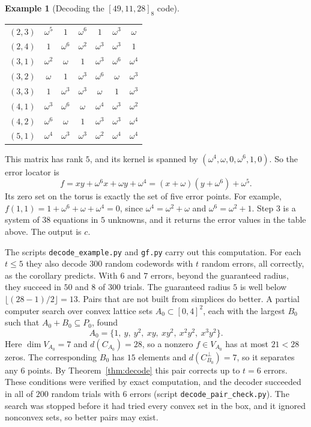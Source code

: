 \documentclass[12pt,letterpaper]{article}
\numberwithin{equation}{section}
\theoremstyle{definition}
\newtheorem{example}[theorem]{Example}
\theoremstyle{remark}
\begin{document}
\begin{example}[{Decoding the $[49,11,28]_8$ code}]
\begin{center}
\begin{tabular}{@{}c|cccccc@{}}
$(2,3)$ & $\omega^{5}$ & $1$ & $\omega^{6}$ & $1$ & $\omega^{3}$ & $\omega$\\
$(2,4)$ & $1$ & $\omega^{6}$ & $\omega^{2}$ & $\omega^{3}$ & $\omega^{3}$ & $1$\\
$(3,1)$ & $\omega^{2}$ & $\omega$ & $1$ & $\omega^{3}$ & $\omega^{6}$ & $\omega^{4}$\\
$(3,2)$ & $\omega$ & $1$ & $\omega^{3}$ & $\omega^{6}$ & $\omega$ & $\omega^{3}$\\
$(3,3)$ & $1$ & $\omega^{3}$ & $\omega^{3}$ & $\omega$ & $1$ & $\omega^{3}$\\
$(4,1)$ & $\omega^{3}$ & $\omega^{6}$ & $\omega$ & $\omega^{4}$ & $\omega^{3}$ & $\omega^{2}$\\
$(4,2)$ & $\omega^{6}$ & $\omega$ & $1$ & $\omega^{3}$ & $\omega^{3}$ & $\omega^{4}$\\
$(5,1)$ & $\omega^{4}$ & $\omega^{3}$ & $\omega^{3}$ & $\omega^{2}$ & $\omega^{4}$ & $\omega^{4}$\\
\end{tabular}
\end{center}
This matrix has rank $5$, and its kernel is spanned by
$(\omega^4,\omega,0,\omega^6,1,0)$. So the error locator is
\[
f=xy+\omega^6x+\omega y+\omega^4=(x+\omega)(y+\omega^6)+\omega^5 .
\]
Its zero set on the torus is exactly the set of five error points. For example,
$f(1,1)=1+\omega^6+\omega+\omega^4=0$, since $\omega^4=\omega^2+\omega$ and
$\omega^6=\omega^2+1$. Step 3 is a system of $38$ equations in $5$ unknowns,
and it returns the error values in the table above. The output is $c$.

The scripts \texttt{decode\_example.py} and \texttt{gf.py} carry out this
computation. For each $t\le5$ they also decode $300$ random codewords with $t$
random errors, all correctly, as the corollary predicts. With $6$ and $7$
errors, beyond the guaranteed radius, they succeed in $50$ and $8$ of $300$
trials. The guaranteed radius $5$ is well below $\lfloor(28-1)/2\rfloor=13$. Pairs
that are not built from simplices do better. A partial computer search over
convex lattice sets $A_0\subset[0,4]^2$, each with the largest $B_0$ such
that $A_0+B_0\subseteq P_0$, found
\[
A_0=\{1,\ y,\ y^2,\ xy,\ xy^2,\ x^2y^2,\ x^3y^2\}.
\]
Here $\dim V_{A_0}=7$ and $d(C_{A_0})=28$, so a nonzero $f\in V_{A_0}$ has at most
$21<28$ zeros. The corresponding $B_0$ has $15$ elements and
$d(C_{B_0}^\perp)=7$, so it separates any $6$ points. By
Theorem~\ref{thm:decode} this pair corrects up to $t=6$ errors. These
conditions were verified by exact computation, and the decoder succeeded in
all of $200$ random trials with $6$ errors (script
\texttt{decode\_pair\_check.py}). The search was stopped before it had tried every
convex set in the box, and it ignored nonconvex sets, so better pairs may
exist.
\end{example}
\end{document}
